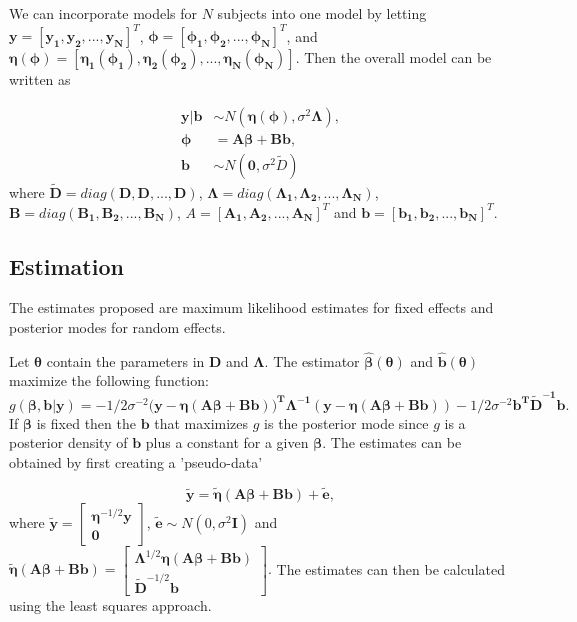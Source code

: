 \documentclass{article}
\numberwithin{equation}{section}
\begin{document}
We can incorporate models for $N$ subjects into one model by letting
$\bm{y}=[\bm{y_1},\bm{y_2},...,\bm{y_N}]^T$, $\bm{\phi} = [\bm{\phi_1},\bm{\phi_2},...,\bm{\phi_N}]^T$, and $\bm{\eta(\phi)}=[\bm{\eta_1(\phi_1)},\bm{\eta_2(\phi_2)},...,\bm{\eta_N(\phi_N)}]$. Then the overall model can be written as 


\begin{equation}
\begin{split}
\bm{y|b} &\sim N(\bm{\eta(\bm{\phi})},\sigma^2 \bm{\Lambda}), \\
\bm{\phi} &= \bm{A}\bm{\beta}+\bm{B}\bm{b}, \\
\bm{b} &\sim N(\bm{0},\sigma^2 \widetilde{D})
\end{split}
\end{equation}
where $\bm{\widetilde{D}} = diag(\bm{D},\bm{D},...,\bm{D})$, $\bm{\Lambda} = diag(\bm{\Lambda_1},\bm{\Lambda_2},...,\bm{\Lambda_N})$, $\bm{B} = diag(\bm{B_1},\bm{B_2},...,\bm{B_N})$, $A= [\bm{A_1},\bm{A_2},...,\bm{A_N}]^T$ and $\bm{b} = [\bm{b_1},\bm{b_2},...,\bm{b_N}]^T$.


\subsection{Estimation}
The estimates \cite{lindstrom1990nonlinear} proposed are maximum likelihood estimates for fixed effects and posterior modes for random effects.

Let $\bm{\theta}$ contain the parameters in $\bm{D}$ and $\bm{\Lambda}$. The estimator $\bm{\hat{\beta}(\theta)}$ and $\bm{\hat{b}(\theta)}$ maximize the following function:
\begin{equation}
g(\bm{\beta},\bm{b}|\bm{y}) = -1/2 \sigma^{-2}(\bm{y-\eta(A\beta+Bb))^T\Lambda^{-1}(y-\eta(A\beta+Bb))} -1/2\sigma^{-2}\bm{b^T \widetilde{D}^{-1}b}.
\end{equation}
If $\bm{\beta}$ is fixed then the $\bm{b}$ that maximizes $g$ is the posterior mode since $g$ is a posterior density of $\bm{b}$ plus a constant for a given $\bm{\beta}$. The estimates can be obtained by first creating a 'pseudo-data'

\begin{equation}
\bm{\widetilde{y}} = \bm{\widetilde{\eta}}(\bm{A}\bm{\beta}+\bm{B}\bm{b}) +\bm{\widetilde{e}},
\end{equation}
where 
$\bm{\widetilde{y}} = 
\begin{bmatrix}
\bm{\eta}^{-1/2} \bm{y}\\ \bm{0}
\end{bmatrix}$, 
$ \bm{\widetilde{e}} \sim N(0, \sigma^2 \bm{\text{I}})$ and $\bm{\widetilde{\eta}}(\bm{A}\bm{\beta}+\bm{B}\bm{b}) = 
\begin{bmatrix}
\bm{\Lambda}^{1/2}\bm{\eta(A\beta+Bb)} \\
\bm{\widetilde{D}}^{-1/2}\bm{b}
\end{bmatrix}.$
 The estimates can then be calculated using the least squares approach.
 
\end{document}
